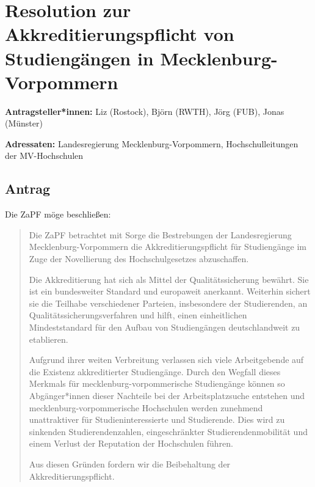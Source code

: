 \documentclass[draft,10pt,oneside]{scrartcl}
\begin{document}
\section*{Resolution zur Akkreditierungspflicht von Studiengängen in Mecklenburg-Vorpommern}

\textbf{Antragsteller*innen:} Liz (Rostock), Björn (RWTH), Jörg (FUB), Jonas (Münster)

\textbf{Adressaten:} Landesregierung Mecklenburg-Vorpommern, Hochschulleitungen der MV-Hochschulen

\subsection*{Antrag}

Die ZaPF möge beschließen:

\begin{quote}
    Die ZaPF betrachtet mit Sorge die Bestrebungen der Landesregierung
    Mecklenburg-Vorpommern die Akkreditierungspflicht für Studiengänge im Zuge
    der Novellierung des Hochschulgesetzes abzuschaffen.

    Die Akkreditierung hat sich als Mittel der Qualitätssicherung bewährt. Sie
    ist ein bundesweiter Standard und europaweit anerkannt. Weiterhin sichert
    sie die Teilhabe verschiedener Parteien, insbesondere der Studierenden, an
    Qualitätssicherungsverfahren und hilft, einen einheitlichen Mindeststandard
    für den Aufbau von Studiengängen deutschlandweit zu etablieren.

    Aufgrund ihrer weiten Verbreitung verlassen sich viele Arbeitgebende auf
    die Existenz akkreditierter Studiengänge. Durch den Wegfall dieses Merkmals
    für mecklenburg-vorpommerische Studiengänge können so Abgänger*innen dieser
    Nachteile bei der Arbeitsplatzsuche entstehen und
    mecklenburg-vorpommerische Hochschulen werden zunehmend unattraktiver für
    Studieninteressierte und Studierende. Dies wird zu sinkenden
    Studierendenzahlen, eingeschränkter Studierendenmobilität und einem Verlust
    der Reputation der Hochschulen führen.

    Aus diesen Gründen fordern wir die Beibehaltung der Akkreditierungspflicht.
\end{quote}
\end{document}
